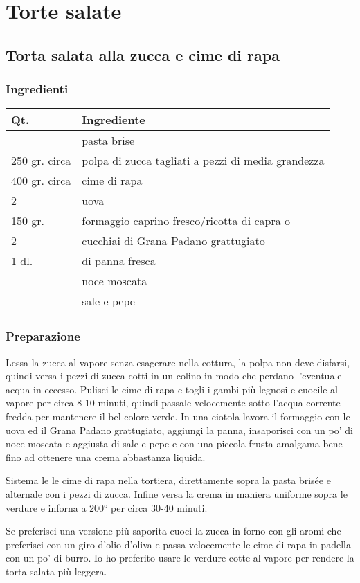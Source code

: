 \documentclass[12pt,a4]{memoir}
\author{Vittorio Zaccaria}
\date{\today}
\title{}
\begin{document}
\tableofcontents


\chapter{Torte salate}
\label{sec:org826149c}
\section{Torta salata alla zucca e cime di rapa}
\label{sec:org292f129}
\newpage
\subsection{Ingredienti}
\label{sec:org3e60a23}

\begin{center}
\begin{tabular}{ll}
Qt. & Ingrediente\\
\hline
 & pasta brise\\
250 gr. circa & polpa di zucca tagliati a pezzi di media grandezza\\
400 gr. circa & cime di rapa\\
2 & uova\\
150 gr. & formaggio caprino fresco/ricotta di capra o\\
2 & cucchiai di Grana Padano grattugiato\\
1 dl. & di panna fresca\\
 & noce moscata\\
 & sale e pepe\\
\end{tabular}
\end{center}

\subsection{Preparazione}
\label{sec:org14f0894}

Lessa la zucca al vapore senza esagerare nella cottura, la polpa non
deve disfarsi, quindi versa i pezzi di zucca cotti in un colino in modo
che perdano l'eventuale acqua in eccesso. Pulisci le cime di rapa e
togli i gambi più legnosi e cuocile al vapore per circa 8-10 minuti,
quindi passale velocemente sotto l'acqua corrente fredda per mantenere
il bel colore verde. In una ciotola lavora il formaggio con le uova ed
il Grana Padano grattugiato, aggiungi la panna, insaporisci con un po'
di noce moscata e aggiusta di sale e pepe e con una piccola frusta
amalgama bene fino ad ottenere una crema abbastanza liquida.

Sistema le le cime di rapa nella tortiera, direttamente sopra la pasta
brisée e alternale con i pezzi di zucca. Infine versa la crema in
maniera uniforme sopra le verdure e inforna a 200° per circa 30-40
minuti.

Se preferisci una versione più saporita cuoci la zucca in forno con gli
aromi che preferisci con un giro d'olio d'oliva e passa velocemente le
cime di rapa in padella con un po' di burro. Io ho preferito usare le
verdure cotte al vapore per rendere la torta salata più leggera. 
\end{document}
